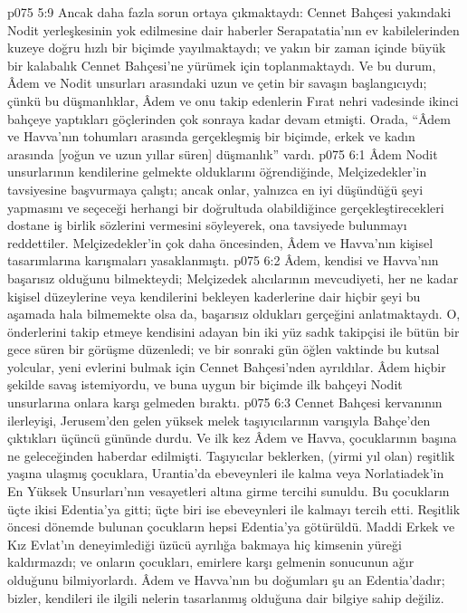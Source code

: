 \vs p075 5:9 Ancak daha fazla sorun ortaya çıkmaktaydı: Cennet Bahçesi yakındaki Nodit yerleşkesinin yok edilmesine dair haberler Serapatatia’nın ev kabilelerinden kuzeye doğru hızlı bir biçimde yayılmaktaydı; ve yakın bir zaman içinde büyük bir kalabalık Cennet Bahçesi’ne yürümek için toplanmaktaydı. Ve bu durum, Âdem ve Nodit unsurları arasındaki uzun ve çetin bir savaşın başlangıcıydı; çünkü bu düşmanlıklar, Âdem ve onu takip edenlerin Fırat nehri vadesinde ikinci bahçeye yaptıkları göçlerinden çok sonraya kadar devam etmişti. Orada, “Âdem ve Havva’nın tohumları arasında gerçekleşmiş bir biçimde, erkek ve kadın arasında [yoğun ve uzun yıllar süren] düşmanlık” vardı.
\vs p075 6:1 Âdem Nodit unsurlarının kendilerine gelmekte olduklarını öğrendiğinde, Melçizedekler’in tavsiyesine başvurmaya çalıştı; ancak onlar, yalnızca en iyi düşündüğü şeyi yapmasını ve seçeceği herhangi bir doğrultuda olabildiğince gerçekleştirecekleri dostane iş birlik sözlerini vermesini söyleyerek, ona tavsiyede bulunmayı reddettiler. Melçizedekler’in çok daha öncesinden, Âdem ve Havva’nın kişisel tasarımlarına karışmaları yasaklanmıştı.
\vs p075 6:2 Âdem, kendisi ve Havva’nın başarısız olduğunu bilmekteydi; Melçizedek alıcılarının mevcudiyeti, her ne kadar kişisel düzeylerine veya kendilerini bekleyen kaderlerine dair hiçbir şeyi bu aşamada hala bilmemekte olsa da, başarısız oldukları gerçeğini anlatmaktaydı. O, önderlerini takip etmeye kendisini adayan bin iki yüz sadık takipçisi ile bütün bir gece süren bir görüşme düzenledi; ve bir sonraki gün öğlen vaktinde bu kutsal yolcular, yeni evlerini bulmak için Cennet Bahçesi’nden ayrıldılar. Âdem hiçbir şekilde savaş istemiyordu, ve buna uygun bir biçimde ilk bahçeyi Nodit unsurlarına onlara karşı gelmeden bıraktı.
\vs p075 6:3 Cennet Bahçesi kervanının ilerleyişi, Jerusem’den gelen yüksek melek taşıyıcılarının varışıyla Bahçe’den çıktıkları üçüncü gününde durdu. Ve ilk kez Âdem ve Havva, çocuklarının başına ne geleceğinden haberdar edilmişti. Taşıyıcılar beklerken, (yirmi yıl olan) reşitlik yaşına ulaşmış çocuklara, Urantia’da ebeveynleri ile kalma veya Norlatiadek’in En Yüksek Unsurları’nın vesayetleri altına girme tercihi sunuldu. Bu çocukların üçte ikisi Edentia’ya gitti; üçte biri ise ebeveynleri ile kalmayı tercih etti. Reşitlik öncesi dönemde bulunan çocukların hepsi Edentia’ya götürüldü. Maddi Erkek ve Kız Evlat’ın deneyimlediği üzücü ayrılığa bakmaya hiç kimsenin yüreği kaldırmazdı; ve onların çocukları, emirlere karşı gelmenin sonucunun ağır olduğunu bilmiyorlardı. Âdem ve Havva’nın bu doğumları şu an Edentia’dadır; bizler, kendileri ile ilgili nelerin tasarlanmış olduğuna dair bilgiye sahip değiliz.
